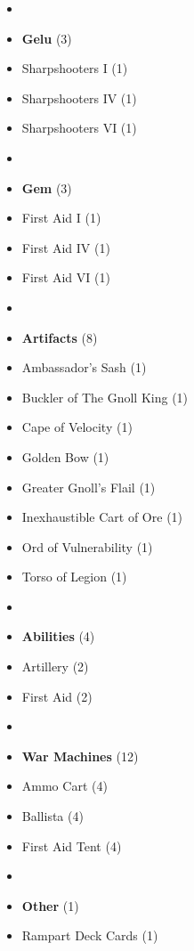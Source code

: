 \begin{multicols*}{3}
\begin{itemize}[leftmargin=0pt, label={}, noitemsep, noitemsep]
  \item
  \item \textbf{Gelu} (3)
  \item Sharpshooters I (1)
  \item Sharpshooters IV (1)
  \item Sharpshooters VI (1)
  \item
  \item \textbf{Gem} (3)
  \item First Aid I (1)
  \item First Aid IV (1)
  \item First Aid VI (1)
  \item
  \item \textbf{Artifacts} (8)
  \item Ambassador's Sash (1)
  \item Buckler of The Gnoll King (1)
  \item Cape of Velocity (1)
  \item Golden Bow (1)
  \item Greater Gnoll's Flail (1)
  \item Inexhaustible Cart of Ore (1)
  \item Ord of Vulnerability (1)
  \item Torso of Legion (1)
  \item
  \item \textbf{Abilities} (4)
  \item Artillery (2)
  \item First Aid (2)
  \item
  \item \textbf{War Machines} (12)
  \item Ammo Cart (4)
  \item Ballista (4)
  \item First Aid Tent (4)
  \item
  \item \textbf{Other} (1)
  \item Rampart Deck Cards (1)
\end{itemize}

\end{multicols*}
